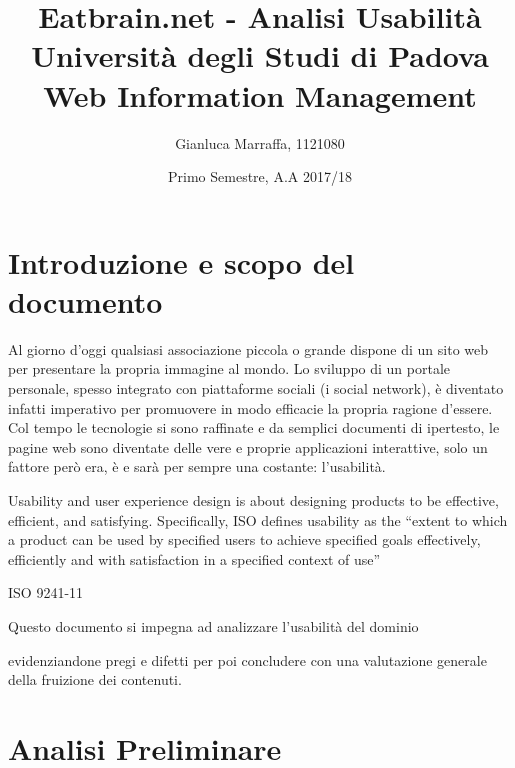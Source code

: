 \documentclass[10pt,a4paper]{article}
\title{
  Eatbrain.net - Analisi Usabilità \\
  Università degli Studi di Padova \\
  Web Information Management
}
\author{
  Gianluca Marraffa, 1121080
}
\date{Primo Semestre, A.A 2017/18}
\newcommand{\URI}[3][blue]{\href{#2}{\color{#1}{#3}}}%
\begin{document}
\maketitle
\newpage
{}
\tableofcontents
\newpage
{}

\section{Introduzione e scopo del documento}
Al giorno d'oggi qualsiasi associazione piccola o grande dispone di un sito web per presentare la propria immagine al mondo. Lo sviluppo di un portale personale, spesso integrato con piattaforme sociali (i social network), è diventato infatti imperativo per promuovere in modo efficacie la propria ragione d'essere. Col tempo le tecnologie si sono raffinate e da semplici documenti di ipertesto, le pagine web sono diventate delle vere e proprie applicazioni interattive, solo un fattore però era, è e sarà per sempre una costante: l'usabilità.
\setlength{\epigraphwidth}{0.8\textwidth}
\epigraph{Usability and user experience design is about designing products to be effective, efficient, and satisfying. Specifically, ISO defines usability as the “extent to which a product can be used by specified users to achieve specified goals effectively, efficiently and with satisfaction in a specified context of use”}{ISO 9241-11}
Questo documento si impegna ad analizzare l'usabilità del dominio
\begin{center}
	\URI{https://eatbrain.net/}{eatbrain.net}
\end{center}
 evidenziandone pregi e difetti per poi concludere con una valutazione generale della fruizione dei contenuti.
 \newpage
\section{Analisi Preliminare}
\end{document}
